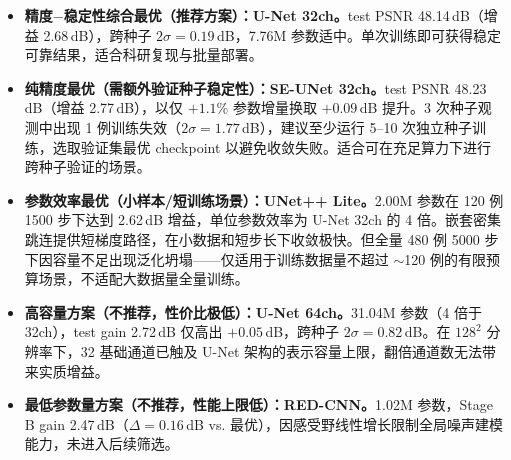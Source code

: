 \documentclass[UTF8,a4paper,12pt]{ctexart}
\begin{document}
\begin{itemize}
  \item \textbf{精度$-$稳定性综合最优（推荐方案）：U-Net 32ch。}test PSNR 48.14\,dB（增益 2.68\,dB），跨种子 $2\sigma=0.19$\,dB，7.76M 参数适中。单次训练即可获得稳定可靠结果，适合科研复现与批量部署。

  \item \textbf{纯精度最优（需额外验证种子稳定性）：SE-UNet 32ch。}test PSNR 48.23\,dB（增益 2.77\,dB），以仅 $+1.1\%$ 参数增量换取 $+0.09$\,dB 提升。3 次种子观测中出现 1 例训练失效（$2\sigma=1.77$\,dB），建议至少运行 5--10 次独立种子训练，选取验证集最优 checkpoint 以避免收敛失败。适合可在充足算力下进行跨种子验证的场景。

  \item \textbf{参数效率最优（小样本/短训练场景）：UNet++ Lite。}2.00M 参数在 120 例 1500 步下达到 2.62\,dB 增益，单位参数效率为 U-Net 32ch 的 4 倍。嵌套密集跳连提供短梯度路径，在小数据和短步长下收敛极快。但全量 480 例 5000 步下因容量不足出现泛化坍塌——仅适用于训练数据量不超过 $\sim$120 例的有限预算场景，不适配大数据量全量训练。

  \item \textbf{高容量方案（不推荐，性价比极低）：U-Net 64ch。}31.04M 参数（4 倍于 32ch），test gain 2.72\,dB 仅高出 $+0.05$\,dB，跨种子 $2\sigma=0.82$\,dB。在 $128^2$ 分辨率下，32 基础通道已触及 U-Net 架构的表示容量上限，翻倍通道数无法带来实质增益。

  \item \textbf{最低参数量方案（不推荐，性能上限低）：RED-CNN。}1.02M 参数，Stage B gain 2.47\,dB（$\Delta=0.16$\,dB vs. 最优），因感受野线性增长限制全局噪声建模能力，未进入后续筛选。
\end{itemize}
\end{document}
